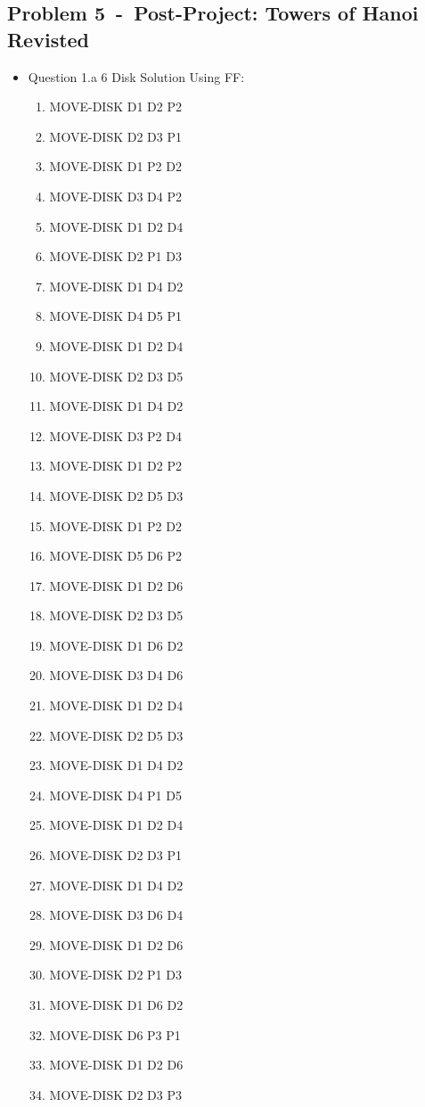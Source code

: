 \documentclass[12pt]{article}
\newcommand{\problem}[2]{\section*{Problem {#1}~-~{#2}}}
\begin{document}
\newpage
\newpage
\newpage
\begin{appendix}
\problem{5}{Post-Project: Towers of Hanoi Revisted}
  \begin{itemize}
     \item Question 1.a 6 Disk Solution Using FF:
      \begin{enumerate}
	\item  MOVE-DISK D1 D2 P2
	\item  MOVE-DISK D2 D3 P1
	\item  MOVE-DISK D1 P2 D2
	\item  MOVE-DISK D3 D4 P2
	\item  MOVE-DISK D1 D2 D4
	\item  MOVE-DISK D2 P1 D3
	\item  MOVE-DISK D1 D4 D2
	\item  MOVE-DISK D4 D5 P1
	\item  MOVE-DISK D1 D2 D4
	\item  MOVE-DISK D2 D3 D5
	\item  MOVE-DISK D1 D4 D2
	\item  MOVE-DISK D3 P2 D4
	\item  MOVE-DISK D1 D2 P2
	\item  MOVE-DISK D2 D5 D3
	\item  MOVE-DISK D1 P2 D2
	\item  MOVE-DISK D5 D6 P2
	\item  MOVE-DISK D1 D2 D6
	\item  MOVE-DISK D2 D3 D5
	\item  MOVE-DISK D1 D6 D2
	\item  MOVE-DISK D3 D4 D6
	\item  MOVE-DISK D1 D2 D4
	\item  MOVE-DISK D2 D5 D3
	\item  MOVE-DISK D1 D4 D2
	\item  MOVE-DISK D4 P1 D5
	\item  MOVE-DISK D1 D2 D4
	\item  MOVE-DISK D2 D3 P1
	\item  MOVE-DISK D1 D4 D2
	\item  MOVE-DISK D3 D6 D4
	\item  MOVE-DISK D1 D2 D6
	\item  MOVE-DISK D2 P1 D3
	\item  MOVE-DISK D1 D6 D2
	\item  MOVE-DISK D6 P3 P1
	\item  MOVE-DISK D1 D2 D6
	\item  MOVE-DISK D2 D3 P3

\end{enumerate}
\end{itemize}
\end{appendix}
\end{document}
